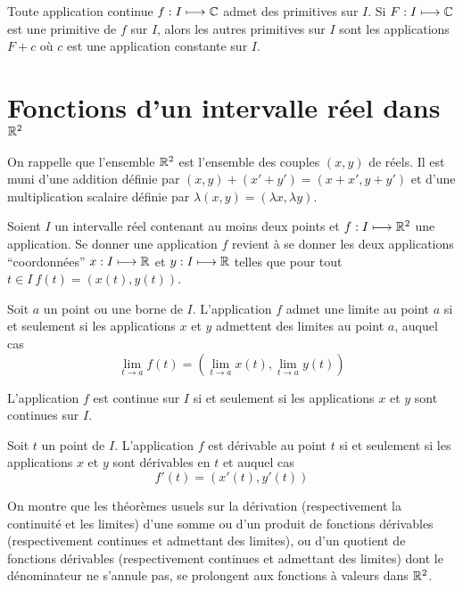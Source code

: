 \begin{theo}
  Toute application continue $f : I \longmapsto \mathbb{C}$ admet des primitives sur $I$. Si $F : I \longmapsto \mathbb{C}$ est une primitive de $f$ sur $I$, alors les autres primitives sur $I$ sont les applications $F+c$ où $c$ est une application constante sur $I$.
\end{theo}

\section{Fonctions d'un intervalle réel dans $\mathbb{R}^2$}

On rappelle que l'ensemble $\mathbb{R}^2$ est l'ensemble des couples $(x,y)$ de réels. Il est muni d'une addition définie par $(x,y)+(x'+y') = (x+x',y+y')$ et d'une multiplication scalaire définie par $\lambda(x,y) = (\lambda x, \lambda y)$.

Soient $I$ un intervalle réel contenant au moins deux points et $f : I \longmapsto \mathbb{R}^2$ une application. Se donner une application $f$ revient à se donner les deux applications ``coordonnées'' $x : I \longmapsto \mathbb{R}$ et $y : I \longmapsto \mathbb{R}$ telles que pour tout $t \in I \ f(t)=(x(t),y(t))$.

\begin{prop}
  Soit $a$ un point ou une borne de $I$. L'application $f$ admet une limite au point $a$ si et seulement si les applications $x$ et $y$ admettent des limites au point $a$, auquel cas
  \begin{equation}
    \lim\limits_{t \to a} f(t) = \left(\lim\limits_{t \to a} x(t) ,\lim\limits_{t \to a} y(t)\right)
  \end{equation}
\end{prop}
\begin{prop}
  L'application $f$ est continue sur $I$ si et seulement si les applications $x$ et $y$ sont continues sur $I$.
\end{prop}
\begin{prop}
  Soit $t$ un point de $I$. L'application $f$ est dérivable au point $t$ si et seulement si les applications $x$ et $y$ sont dérivables en $t$ et auquel cas
  \begin{equation}
    f'(t) = (x'(t),y'(t))
  \end{equation}
\end{prop}
On montre que les théorèmes usuels sur la dérivation (respectivement la continuité et les limites) d'une somme ou d'un produit de fonctions dérivables (respectivement continues et admettant des limites), ou d'un quotient de fonctions dérivables (respectivement continues et admettant des limites) dont le dénominateur ne s'annule pas, se prolongent aux fonctions à valeurs dans $\mathbb{R}^2$.